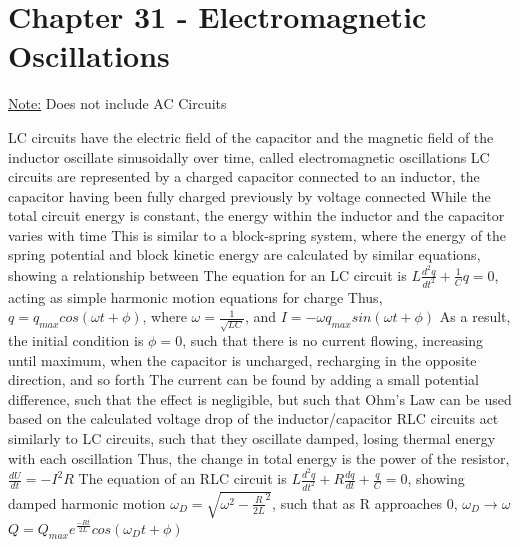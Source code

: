 \documentclass[11 pt, twoside]{article}
\newenvironment{outline*}
{
	\begin{outline}[enumerate]
	}
	{\end{outline}
}
\begin{document}
\section{Chapter 31 - Electromagnetic Oscillations}
\underline{Note:} Does not include AC Circuits
\begin{outline*}
\1 LC circuits have the electric field of the capacitor and the magnetic field of the inductor oscillate sinusoidally over time, called electromagnetic oscillations
\2 LC circuits are represented by a charged capacitor connected to an inductor, the capacitor having been fully charged previously by voltage connected
\2 While the total circuit energy is constant, the energy within the inductor and the capacitor varies with time
\3 This is similar to a block-spring system, where the energy of the spring potential and block kinetic energy are calculated by similar equations, showing a relationship between
\2 The equation for an LC circuit is $L\frac{d^2q}{dt^2} + \frac{1}{C}q = 0$, acting as simple harmonic motion equations for charge
\3 Thus, $q = q_{max}cos(\omega t + \phi)$, where $\omega = \frac{1}{\sqrt{LC}}$, and $I = -\omega q_{max}sin(\omega t + \phi)$
\3 As a result, the initial condition is $\phi = 0$, such that there is no current flowing, increasing until maximum, when the capacitor is uncharged, recharging in the opposite direction, and so forth
\3 The current can be found by adding a small potential difference, such that the effect is negligible, but such that Ohm's Law can be used based on the calculated voltage drop of the inductor/capacitor
\1 RLC circuits act similarly to LC circuits, such that they oscillate damped, losing thermal energy with each oscillation
\2 Thus, the change in total energy is the power of the resistor, $\frac{dU}{dt} = -I^2R$
\2 The equation of an RLC circuit is $L\frac{d^2q}{dt^2} + R\frac{dq}{dt} + \frac{q}{C} = 0$, showing damped harmonic motion
\3 $\omega_{D} = \sqrt{\omega^2 - \frac{R}{2L}^2}$, such that as R approaches 0, $\omega_D \to \omega$
\3 $Q = Q_{max}e^{\frac{-Rt}{2L}}cos(\omega_Dt + \phi)$
\end{outline*}
\end{document}
